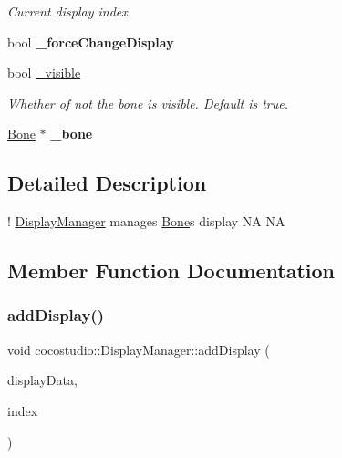 \begin{DoxyCompactItemize}
\begin{DoxyCompactList}\small\item\em Current display index. \end{DoxyCompactList}\item 
\mbox{\label{classcocostudio_1_1DisplayManager_a4894194f482a361e63829afa6618c89e}} 
bool {\bfseries \+\_\+force\+Change\+Display}
\item 
\mbox{\label{classcocostudio_1_1DisplayManager_a971c7e2657e7d0b3dc4ea6c1d24c8fe0}} 
bool \hyperlink{classcocostudio_1_1DisplayManager_a971c7e2657e7d0b3dc4ea6c1d24c8fe0}{\+\_\+visible}
\begin{DoxyCompactList}\small\item\em Whether of not the bone is visible. Default is true. \end{DoxyCompactList}\item 
\mbox{\label{classcocostudio_1_1DisplayManager_adc752561deedaadb3936543739be0a8f}} 
\hyperlink{classcocostudio_1_1Bone}{Bone} $\ast$ {\bfseries \+\_\+bone}
\end{DoxyCompactItemize}


\subsection{Detailed Description}
! \hyperlink{classcocostudio_1_1DisplayManager}{Display\+Manager} manages \hyperlink{classcocostudio_1_1Bone}{Bone}\textquotesingle{}s display  NA  NA 

\subsection{Member Function Documentation}
\mbox{\label{classcocostudio_1_1DisplayManager_a8e9ebcae212efcdebc814dc4010b4fc8}} 
\subsubsection{\texorpdfstring{add\+Display()}{addDisplay()}\hspace{0.1cm}{\footnotesize\ttfamily [1/3]}}
{\footnotesize\ttfamily void cocostudio\+::\+Display\+Manager\+::add\+Display (\begin{DoxyParamCaption}\item[{\hyperlink{classcocostudio_1_1DisplayData}{Display\+Data} $\ast$}]{display\+Data,  }\item[{int}]{index }\end{DoxyParamCaption})}

